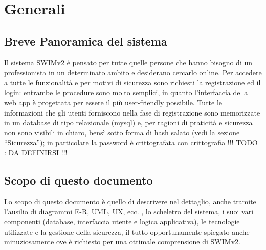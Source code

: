 \section{Generali}

\subsection{Breve Panoramica del sistema}
Il sistema SWIMv2 è pensato per tutte quelle persone che hanno bisogno di un professionista in un determinato ambito e desiderano cercarlo online. Per accedere a tutte le funzionalità
e per motivi di sicurezza sono richiesti la registrazione ed il login: entrambe le procedure sono molto semplici, in quanto l'interfaccia della web app è progettata per essere il più
user-friendly possibile. Tutte le informazioni che gli utenti forniscono nella fase di registrazione sono memorizzate in un database di tipo relazionale (mysql) e, per ragioni di
praticità e sicurezza non sono visibili in chiaro, bensì sotto forma di hash salato (vedi la sezione ``Sicurezza''); in particolare la password è crittografata con crittografia
!!! TODO : DA DEFINIRSI !!!

\subsection{Scopo di questo documento}
Lo scopo di questo documento è quello di descrivere nel dettaglio, anche tramite l'ausilio di diagrammi E-R, UML, UX, ecc. , lo scheletro del sistema, i suoi vari componenti (database,
interfaccia utente e logica applicativa), le tecnologie utilizzate e la gestione della sicurezza, il tutto opportunamente spiegato anche minuziosamente ove è richiesto per una
ottimale comprensione di SWIMv2.

